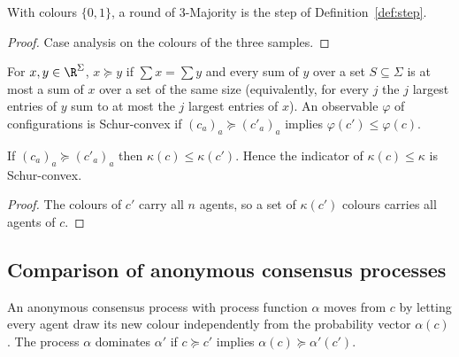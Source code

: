 \begin{lemma}\label{lem:as-bool}
\leanok{}
With colours $\{0,1\}$, a round of 3-Majority is the step of Definition~\ref{def:step}.
\end{lemma}
\begin{proof}\leanok
Case analysis on the colours of the three samples.
\end{proof}

\begin{definition}\label{def:as-majorization}
\leanok
{}
For $x,y\in\R^\Sigma$, $x\succeq y$ if $\sum x=\sum y$ and every sum of $y$ over a set
$S\subseteq\Sigma$ is at most a sum of $x$ over a set of the same size (equivalently, for every $j$
the $j$ largest entries of $y$ sum to at most the $j$ largest entries of $x$). An observable $\varphi$
of configurations is Schur-convex if $(c_a)_a\succeq(c'_a)_a$ implies $\varphi(c')\le\varphi(c)$.
\end{definition}

\begin{lemma}\label{lem:as-colours}
\leanok
{}
If $(c_a)_a\succeq(c'_a)_a$ then $\kappa(c)\le\kappa(c')$. Hence the indicator of
$\kappa(c)\le\kappa$ is Schur-convex.
\end{lemma}
\begin{proof}\leanok
The colours of $c'$ carry all $n$ agents, so a set of $\kappa(c')$ colours carries all agents of $c$.
\end{proof}

\subsection{Comparison of anonymous consensus processes}

\begin{definition}\label{def:as-ac}
\leanok{}
An anonymous consensus process with process function $\alpha$ moves from $c$ by letting every
agent draw its new colour independently from the probability vector $\alpha(c)$. The process
$\alpha$ dominates $\alpha'$ if $c\succeq c'$ implies $\alpha(c)\succeq\alpha'(c')$.
\end{definition}

